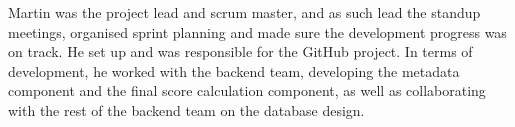 Martin was the project lead and scrum master, and as such lead the standup meetings, organised sprint planning and made sure the development progress was on track. He set up and was responsible for the GitHub project. In terms of development, he worked with the backend team, developing the metadata component and the final score calculation component, as well as collaborating with the rest of the backend team on the database design.
